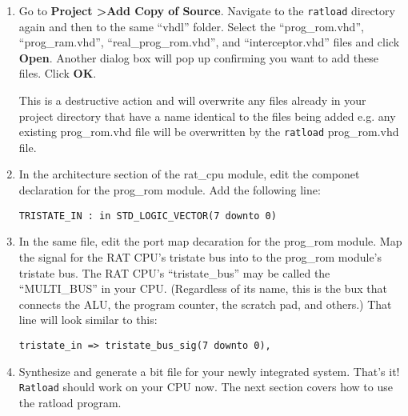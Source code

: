 \documentclass[notitlepage]{article}
\newcommand{\warningsign}{\fontencoding{U}\fontfamily{futs}\Large\selectfont\char 66\relax}
\begin{document}
\begin{enumerate}
\item Go to \textbf{Project \textgreater Add Copy of Source}. Navigate to the \texttt{ratload} directory again and then to the same ``vhdl'' folder. Select the ``prog\_rom.vhd'', ``prog\_ram.vhd'', ``real\_prog\_rom.vhd'', and ``interceptor.vhd'' files and click \textbf{Open}. Another dialog box will pop up confirming you want to add these files. Click \textbf{OK}.

\begin{infobox}
  {\warningsign} This is a destructive action and will overwrite any files already in your project directory that have a name identical to the files being added e.g. any existing prog\_rom.vhd file will be overwritten by the \texttt{ratload} prog\_rom.vhd file.
\end{infobox}

\item In the architecture section of the rat\_cpu module, edit the componet declaration for the prog\_rom module. Add the following line:\\
\centerline{\texttt{TRISTATE\_IN : in STD\_LOGIC\_VECTOR(7 downto 0)}}

\item In the same file, edit the port map decaration for the prog\_rom module. Map the signal for the RAT CPU's tristate bus into to the prog\_rom module's tristate bus. The RAT CPU's ``tristate\_bus'' may be called the ``MULTI\_BUS'' in your CPU. (Regardless of its name, this is the bux that connects the ALU, the program counter, the scratch pad, and others.) That line will look similar to this:\\
  \centerline{\texttt{tristate\_in =\textgreater ~tristate\_bus\_sig(7 downto 0),}}

\item Synthesize and generate a bit file for your newly integrated system. That's it! \texttt{Ratload} should work on your CPU now. The next section covers how to use the ratload program.
\end{enumerate}
\end{document}
